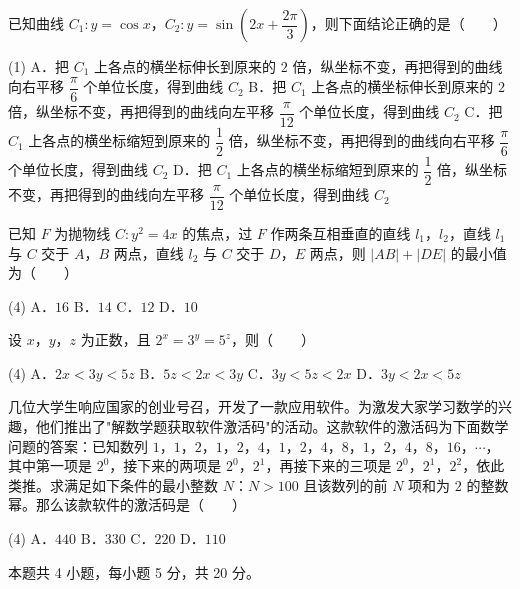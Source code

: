 已知曲线 $C_1:y=\cos x$，$C_2:y=\sin\left(2x+\dfrac{2\pi}3\right)$，则下面结论正确的是（　　）

\begin{gkopts}(1)
\task A．把 $C_1$ 上各点的横坐标伸长到原来的 $2$ 倍，纵坐标不变，再把得到的曲线向右平移 $\dfrac\pi6$ 个单位长度，得到曲线 $C_2$
\task B．把 $C_1$ 上各点的横坐标伸长到原来的 $2$ 倍，纵坐标不变，再把得到的曲线向左平移 $\dfrac\pi{12}$ 个单位长度，得到曲线 $C_2$
\task C．把 $C_1$ 上各点的横坐标缩短到原来的 $\dfrac12$ 倍，纵坐标不变，再把得到的曲线向右平移 $\dfrac\pi6$ 个单位长度，得到曲线 $C_2$
\task D．把 $C_1$ 上各点的横坐标缩短到原来的 $\dfrac12$ 倍，纵坐标不变，再把得到的曲线向左平移 $\dfrac\pi{12}$ 个单位长度，得到曲线 $C_2$
\end{gkopts}

已知 $F$ 为抛物线 $C:y^{2}=4x$ 的焦点，过 $F$ 作两条互相垂直的直线 $l_1$，$l_2$，直线 $l_1$ 与 $C$ 交于 $A$，$B$ 两点，直线 $l_2$ 与 $C$ 交于 $D$，$E$ 两点，则 $|AB|+|DE|$ 的最小值为（　　）

\begin{gkopts}(4)
\task A．$16$
\task B．$14$
\task C．$12$
\task D．$10$
\end{gkopts}

设 $x$，$y$，$z$ 为正数，且 $2^{x}=3^{y}=5^{z}$，则（　　）

\begin{gkopts}(4)
\task A．$2x<3y<5z$
\task B．$5z<2x<3y$
\task C．$3y<5z<2x$
\task D．$3y<2x<5z$
\end{gkopts}

几位大学生响应国家的创业号召，开发了一款应用软件。为激发大家学习数学的兴趣，他们推出了"解数学题获取软件激活码"的活动。这款软件的激活码为下面数学问题的答案：已知数列 $1$，$1$，$2$，$1$，$2$，$4$，$1$，$2$，$4$，$8$，$1$，$2$，$4$，$8$，$16$，$\cdots$，其中第一项是 $2^{0}$，接下来的两项是 $2^{0}$，$2^{1}$，再接下来的三项是 $2^{0}$，$2^{1}$，$2^{2}$，依此类推。求满足如下条件的最小整数 $N$：$N>100$ 且该数列的前 $N$ 项和为 $2$ 的整数幂。那么该款软件的激活码是（　　）

\begin{gkopts}(4)
\task A．$440$
\task B．$330$
\task C．$220$
\task D．$110$
\end{gkopts}

\par\medskip


\begin{gktip}
本题共 4 小题，每小题 5 分，共 20 分。
\end{gktip}

